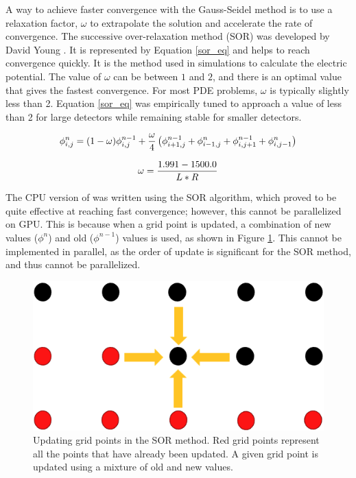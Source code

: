 A way to achieve faster convergence with the Gauss-Seidel method is to use a relaxation factor, $\omega$ to extrapolate the solution and accelerate the rate of convergence. The successive over-relaxation method (SOR) was developed by David Young \cite{Young1950}. It is represented by Equation \ref{sor_eq} and helps to reach convergence quickly. It is the method used in {\siggen} simulations to calculate the electric potential. The value of $\omega$ can be between $1$ and $2$, and there is an optimal value that gives the fastest convergence. For most PDE problems, $\omega$ is typically slightly less than 2. Equation \ref{sor_eq} was empirically tuned to approach a value of less than 2 for large detectors while remaining stable for smaller detectors.

\begin{equation}{\label{sor_eq}}
 \phi_{i,j}^{n} = (1-\omega)\phi^{n-1}_{i,j} + \frac{\omega}{4} \left(\phi^{n-1}_{i+1,j} + \phi^n_{i-1,j} + \phi^{n-1}_{i,j+1} + \phi^n_{i,j-1} \right)
\end{equation}


\begin{equation}{\label{omg}}
\omega = \frac{1.991 - 1500.0}{L*R}
\end{equation}

The CPU version of {\ehd} was written using the SOR algorithm, which proved to be quite effective at reaching fast convergence; however, this cannot be parallelized on GPU. This is because when a grid point is updated, a combination of new values ($\phi^{n}$) and old ($\phi^{n-1}$) values is used, as shown in Figure \ref{fig:sor_methods}. This cannot be implemented in parallel, as the order of update is significant for the SOR method, and thus cannot be parallelized.


\begin{figure}[!htb]
\centering
 \vspace{0.2cm}
\includegraphics[width=0.4\linewidth]{ch4/figs/SOR.png}
\vspace{0.3cm}
\caption{\label{fig:sor_methods} Updating grid points in the SOR method. Red grid points represent all the points that have already been updated. A given grid point is updated using a mixture of old and new values.}
\end{figure}

